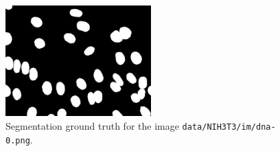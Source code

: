 \documentclass[12pt,a4paper]{article}
\begin{document}
\begin{enumerate}
\begin{enumerate}
        \begin{figure}[h!]
            \centering
            \includegraphics[width=0.5\textwidth]{images/nih3t3-im00-bingt.png}
            \caption{Segmentation ground truth for the image \texttt{data/NIH3T3/im/dna-0.png}.}
            \label{fig:nih3t3-im00-bingt}
        \end{figure}
        

\end{enumerate}
\end{enumerate}
\end{document}
